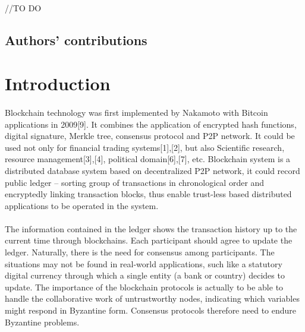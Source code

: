 \documentclass[doublespacing]{bmcart}
\begin{document}
\begin{CJK*}{UTF8}{gbsn}
\paragraph{}
//TO DO
\begin{center}
	\subsection*{Authors' contributions}
\end{center}
\paragraph{}


\section{Introduction}
\paragraph{}
Blockchain technology was first implemented by Nakamoto with Bitcoin applications in 2009[9]. It combines the application of encrypted hash functions, digital signature, Merkle tree, consensus protocol and P2P network. It could be used not only for financial trading systems[1],[2], but also Scientific   research,  resource management[3],[4], political domain[6],[7], etc. Blockchain system is a distributed database system based on decentralized P2P network,  it could record public ledger – sorting group of transactions in chronological order and encryptedly linking transaction blocks,  thus enable trust-less based distributed applications to be operated in the system.
	\paragraph{}
	The information contained in the ledger shows the transaction history up to the current time through blockchains. Each participant should agree to update the ledger. Naturally, there is the need for consensus among participants. The situations may not be found in  real-world applications, such like a statutory digital currency through which a single entity (a bank or country) decides to update. The importance of the blockchain protocols is actually to be able to handle the collaborative work of untrustworthy nodes, indicating which variables might respond in Byzantine form. Consensus protocols therefore need to endure Byzantine problems.

\end{CJK*}
\end{document}
